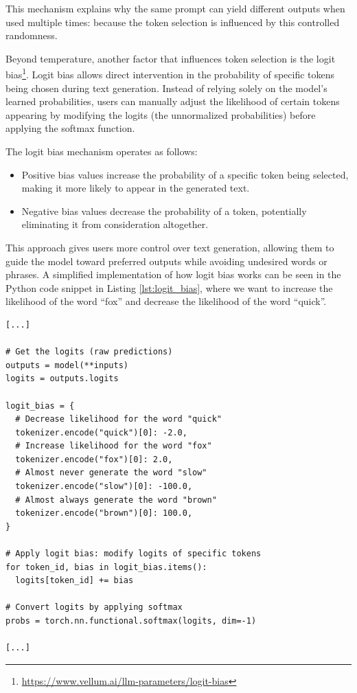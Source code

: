 This mechanism explains why the same prompt can yield different outputs when
used multiple times: because the token selection is influenced by this controlled
randomness.

Beyond temperature, another factor that influences token selection is the logit
bias\footnote{\url{https://www.vellum.ai/llm-parameters/logit-bias}}. Logit bias
allows direct intervention in the probability of specific tokens being chosen
during text generation. Instead of relying solely on the model's learned probabilities,
users can manually adjust the likelihood of certain tokens appearing by
modifying the logits (the unnormalized probabilities) before applying the
softmax function.

The logit bias mechanism operates as follows:

\begin{itemize}
  \item Positive bias values increase the probability of a specific token being selected,
    making it more likely to appear in the generated text.

  \item Negative bias values decrease the probability of a token, potentially
    eliminating it from consideration altogether.
\end{itemize}

This approach gives users more control over text generation, allowing them to
guide the model toward preferred outputs while avoiding undesired words or
phrases. A simplified implementation of how logit bias works can be seen in the Python
code snippet in Listing \ref{lst:logit_bias}, where we want to increase the
likelihood of the word ``fox'' and decrease the likelihood of the word ``quick''.

\vspace{10mm}
\begin{codewindow}
    \begin{lstlisting}
[...]

# Get the logits (raw predictions)
outputs = model(**inputs)
logits = outputs.logits

logit_bias = {
  # Decrease likelihood for the word "quick"
  tokenizer.encode("quick")[0]: -2.0,
  # Increase likelihood for the word "fox"
  tokenizer.encode("fox")[0]: 2.0,
  # Almost never generate the word "slow"
  tokenizer.encode("slow")[0]: -100.0,
  # Almost always generate the word "brown"
  tokenizer.encode("brown")[0]: 100.0,
}

# Apply logit bias: modify logits of specific tokens
for token_id, bias in logit_bias.items():
  logits[token_id] += bias

# Convert logits by applying softmax
probs = torch.nn.functional.softmax(logits, dim=-1)

[...]
\end{lstlisting}
\end{codewindow}
\vspace{10mm}

